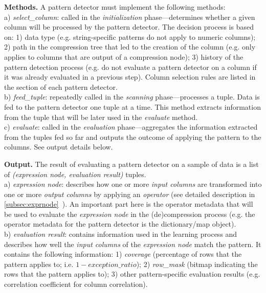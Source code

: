 \textbf{Methods.} A pattern detector must implement the following methods:\\
a) \textit{select\_column}: called in the \textit{initialization} phase---determines whether a given column will be processed by the pattern detector. The decision process is based on: 1) data type (e.g. string-specific patterns do not apply to numeric columns); 2) path in the compression tree that led to the creation of the column (e.g.  only applies to columns that are output of a  compression node); 3) history of the pattern detection process (e.g. do not evaluate a pattern detector on a column if it was already evaluated in a previous step). Column selection rules are listed in the section of each pattern detector.\\
b) \textit{feed\_tuple}: repeatedly called in the \textit{scanning} phase---processes a tuple. Data is fed to the pattern detector one tuple at a time. This method extracts information from the tuple that will be later used in the \textit{evaluate} method.\\
c) \textit{evaluate}: called in the \textit{evaluation} phase---aggregates the information extracted from the tuples fed so far and outputs the outcome of applying the pattern to the columns. See output details below.

\textbf{Output.} The result of evaluating a pattern detector on a sample of data is a list of \textit{(expression node, evaluation result)} tuples.\\
a) \textit{expression node}: describes how one or more \textit{input columns} are transformed into one or more \textit{output columns} by applying an \textit{operator} (see detailed description in \ref{subsec:exprnode}~). An important part here is the operator metadata that will be used to evaluate the \textit{expression node} in the (de)compression process (e.g. the operator metadata for the  pattern detector is the dictionary/map object).\\
b) \textit{evaluation result}: contains information used in the learning process and describes how well the \textit{input columns} of the \textit{expression node} match the pattern. It contains the following information: 1) \textit{coverage} (percentage of rows that the pattern applies to; i.e. \(1 - exception\_ratio\)); 2) \textit{row\_mask} (bitmap indicating the rows that the pattern applies to); 3) other pattern-specific evaluation results (e.g. correlation coefficient for column correlation).

